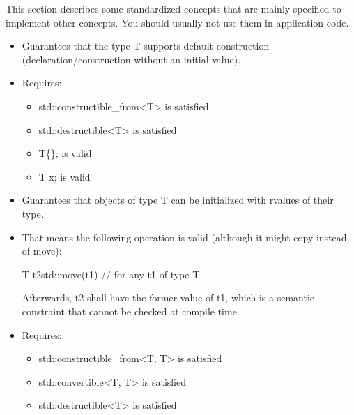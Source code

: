 

This section describes some standardized concepts that are mainly specified to implement other concepts. You should usually not use them in application code.



\begin{itemize}
\item
Guarantees that the type T supports default construction (declaration/construction without an initial value).

\item
Requires:
\begin{itemize}
\item
std::constructible\_from<T> is satisfied

\item
std::destructible<T> is satisfied

\item
T\{\}; is valid

\item
T x; is valid
\end{itemize}
\end{itemize}


\begin{itemize}
\item
Guarantees that objects of type T can be initialized with rvalues of their type.

\item
That means the following operation is valid (although it might copy instead of move):

\begin{cpp}
T t2{std::move(t1)} // for any t1 of type T
\end{cpp}

Afterwards, t2 shall have the former value of t1, which is a semantic constraint that cannot be checked at compile time.

\item
Requires:
\begin{itemize}
\item
std::constructible\_from<T, T> is satisfied

\item
std::convertible<T, T> is satisfied

\item
std::destructible<T> is satisfied
\end{itemize}
\end{itemize}

